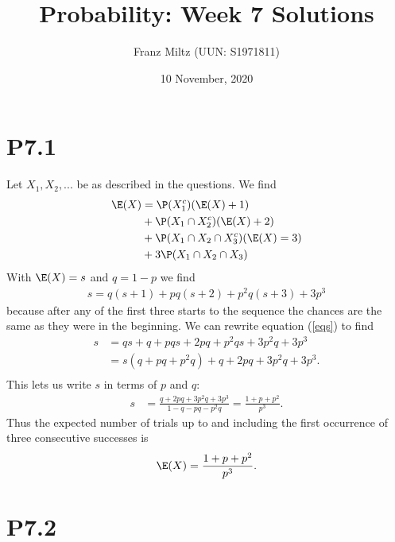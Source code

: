 \documentclass{article}
\begin{document}
\title{Probability: Week 7 Solutions}
\author{Franz Miltz (UUN: S1971811)}
\date{10 November, 2020}
\maketitle


\section*{P7.1}


Let $X_1,X_2,...$ be as described in the questions. We find
\begin{align*}
	\E(X) & = \P(X_1^c)(\E(X)+1)                \\
	      & +\P(X_1\cap X_2^c)(\E(X)+2)         \\
	      & +\P(X_1\cap X_2\cap X_3^c)(\E(X)=3) \\
	      & +3\P(X_1\cap X_2\cap X_3)
\end{align*}
With $\E(X)=s$ and $q=1-p$ we find
\begin{align}
	\label{eqs}
	s = q(s+1) + pq(s+2) + p^2q(s+3) +3p^3
\end{align}
because after any of the first three starts to the sequence the chances
are the same as they were in the beginning.
We can rewrite equation (\ref{eqs}) to find
\begin{align*}
	s & = qs + q + pqs + 2pq + p^2qs + 3p^2q + 3p^3 \\
	  & = s(q+pq+p^2q)+q + 2pq + 3p^2q + 3p^3.      \\
\end{align*}
This lets us write $s$ in terms of $p$ and $q$:
\begin{align*}
	s & = \frac{q+2pq+3p^2q+3p^3}{1-q-pq-p^2q} =\frac{1+p+p^2}{p^3}.
\end{align*}
Thus the expected number of trials up to and including the first occurrence of
three consecutive successes is
\begin{align*}
	\E(X) = \frac{1+p+p^2}{p^3}.
\end{align*}


\section*{P7.2}
\end{document}

